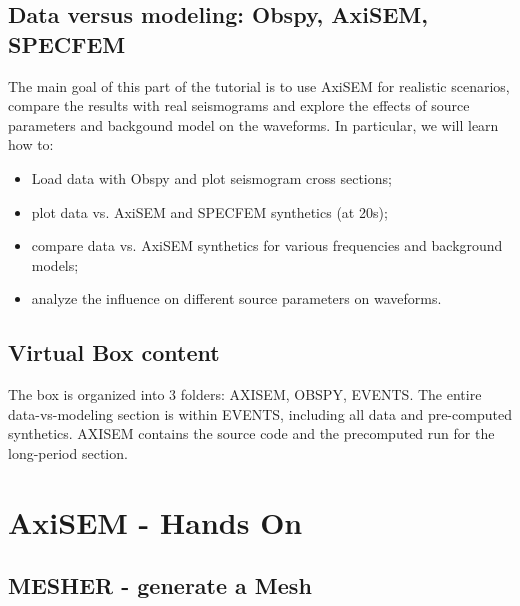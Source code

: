 \documentclass{article}
\begin{document}
\subsection{Data versus modeling: Obspy, AxiSEM, SPECFEM}
The main goal of this part of the tutorial is to use AxiSEM for realistic scenarios, compare the 
results with real seismograms and explore the effects of source parameters and 
backgound model on the waveforms. In particular, we will learn how to:

\begin{itemize}
    \item Load data with Obspy and plot seismogram cross sections;
    \item plot data vs. AxiSEM and SPECFEM synthetics (at 20s);
    \item compare data vs. AxiSEM synthetics for various frequencies and background
          models;
    \item analyze the influence on different source parameters on waveforms.
\end{itemize}


\subsection{Virtual Box content}
The box is organized into 3 folders: AXISEM, OBSPY, EVENTS. The entire
data-vs-modeling section is within EVENTS, including all data and pre-computed
synthetics. AXISEM contains the source code and the precomputed run
for the long-period section.


\newpage

\section{AxiSEM - Hands On}

\subsection{MESHER - generate a Mesh}
\end{document}
